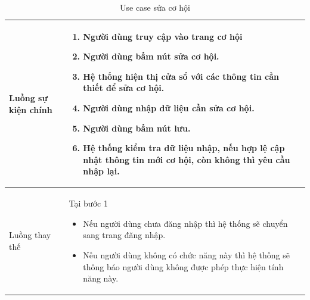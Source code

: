 \documentclass[12pt,a4paper]{article}
\begin{document}
\begin{table}[H]
\begin{tabular}{|p{3.5cm}|p{11.5cm}|c|}
            Luồng sự kiện chính & \vspace{-.8cm}\begin{enumerate}
                                                    \item Người dùng truy cập vào trang cơ hội
                                                    \item  Người dùng bấm nút sửa cơ hội.
                                                    \item  Hệ thống hiện thị cửa sổ với các thông tin cần thiết để sửa cơ hội.
                                                    \item  Người dùng nhập dữ liệu cần sửa cơ hội.
                                                    \item Người dùng bấm nút lưu.
                                                    \item Hệ thống kiểm tra dữ liệu nhập, nếu hợp lệ cập nhật thông tin mới cơ hội, còn không thì yêu cầu nhập lại.
            \end{enumerate}
            \\
            \hline
            Luồng thay thế & Tại bước 1\newline
            \vspace{-.8cm}\begin{itemize}
                              \item Nếu người dùng chưa đăng nhập thì hệ thống sẽ chuyển sang trang đăng nhập.
                              \item  Nếu người dùng không có chức năng này thì hệ thống sẽ thông báo người dùng không được phép thực hiện tính năng này.
            \end{itemize}
            \\
            \hline
        \end{tabular}
        \caption{Use case sửa cơ hội}
    \end{table}


\end{document}
